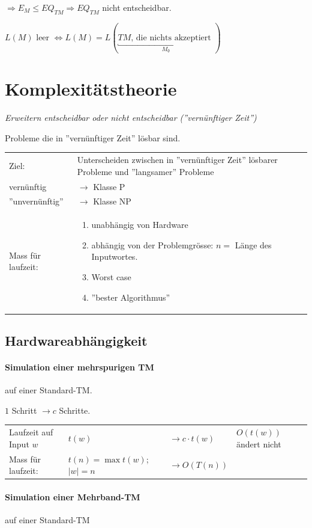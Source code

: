 $\Rightarrow E_M \leq EQ_{TM} \Rightarrow EQ_{TM} $ nicht entscheidbar.

$L(M) \text{ leer } \Leftrightarrow L(M) = L(\underbracket{TM \text{, die nichts akzeptiert }}_{M_\emptyset})$

\section{Komplexitätstheorie}

\emph{Erweitern entscheidbar oder nicht entscheidbar (''vernünftiger Zeit'')}

Probleme die in ''vernünftiger Zeit'' lösbar sind.

\begin{tabu}{l X}
	Ziel: & Unterscheiden zwischen in ''vernünftiger Zeit'' lösbarer Probleme und ''langsamer'' Probleme \\
	vernünftig &$\rightarrow$ Klasse P \\
	''unvernünftig'' &$\rightarrow$ Klasse NP \\
	Mass für laufzeit: & \begin{enumerate}
			\item	unabhängig von Hardware
			\item	abhängig von der Problemgrösse: $n = $ Länge des Inputwortes.
			\item	Worst case
			\item	''bester Algorithmus''
		\end{enumerate}
\end{tabu}


\subsection{Hardwareabhängigkeit}

\paragraph{Simulation einer mehrspurigen TM} auf einer Standard-TM.


$1$ Schritt $\longrightarrow c$ Schritte. \\
\begin{tabu}{l l l l}
Laufzeit auf Input $w$ & $t(w)$ &$\longrightarrow c \cdot t(w)$ & $O(t(w))$ ändert nicht \\
Mass für laufzeit: &$t(n) = \max t(w)$; $|w| = n$ & $\longrightarrow O(T(n))$ 
\end{tabu}

\paragraph{Simulation einer Mehrband-TM} auf einer Standard-TM

